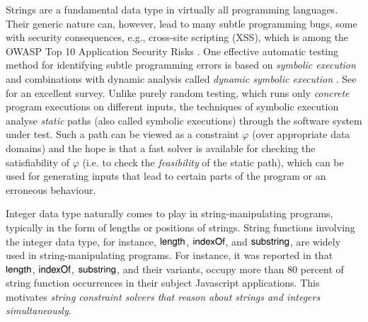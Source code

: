 
Strings are a fundamental data type in virtually all programming languages.
Their generic nature can, however, lead to many subtle programming
bugs, some with security consequences, e.g., cross-site scripting
(XSS), which is among the OWASP Top 10 Application Security Risks
\cite{owasp17}. One effective
automatic testing method for identifying subtle programming errors
is based on \emph{symbolic execution}
\cite{king76} and combinations with dynamic analysis
called \emph{dynamic symbolic execution} \cite{jalangi,DART,EXE,CUTE,KLEE}.
See \cite{symbex-survey} for an excellent survey. Unlike purely random testing,
which runs only \emph{concrete} program executions on different
inputs, the techniques of symbolic execution analyse \emph{static} paths
(also called symbolic executions) through the software system under test.
Such a path can be viewed as a constraint $\varphi$ (over
appropriate data domains) and the hope is that a fast
solver is available for checking the satisfiability of $\varphi$ (i.e. to check
the \emph{feasibility} of the static path), which can be used for generating
inputs that lead to certain parts of the program or an erroneous behaviour.

Integer data type naturally comes to play in string-manipulating programs, typically in the form of lengths or positions of strings. String functions involving the integer data type, for instance,  $\mathsf{length}$, $\mathsf{indexOf}$, and $\mathsf{substring}$, are widely used in string-manipulating programs. For instance, it was reported in \cite{Berkeley-JavaScript} that $\mathsf{length}$, $\mathsf{indexOf}$, $\mathsf{substring}$, and their variants, occupy more than 80 percent of string function occurrences in their subject Javascript applications. This motivates \emph{string constraint solvers that reason about strings and integers simultaneously}.


